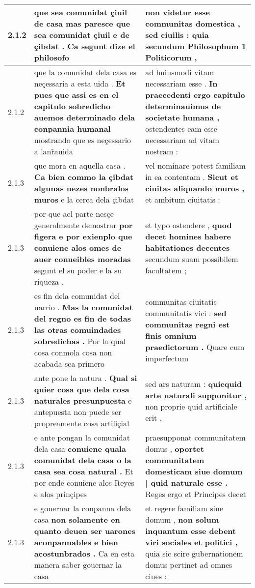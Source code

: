 \begin{tabular}{|p{1cm}|p{6.5cm}|p{6.5cm}|}
2.1.2 & que sea comunidat çiuil de casa mas paresce \textbf{ que sea comunidat çiuil e de çibdat . } Ca segunt dize el philosofo & non videtur esse communitas domestica , \textbf{ sed ciuilis : } quia secundum Philosophum 1 Politicorum , \\\hline
2.1.2 & que la comunidat dela casa es neçessaria a esta uida . \textbf{ Et pues que assi es en el capitulo sobredicho auemos determinado dela conpannia humanal } mostrando que es neçessario a lanr̃auida & ad huiusmodi vitam necessariam esse . \textbf{ In praecedenti ergo capitulo determinauimus de societate humana , } ostendentes eam esse necessariam ad vitam nostram : \\\hline
2.1.3 & que mora en aquella casa . \textbf{ Ca bien commo la çibdat algunas uezes nonbralos muros } e la cerca dela çibdat & vel nominare potest familiam in ea contentam . \textbf{ Sicut et ciuitas aliquando muros , } et ambitum ciuitatis : \\\hline
2.1.3 & por que ael parte nesçe generalmente demostrar \textbf{ por figera e por exienplo que conuiene alos omes de auer conueibles moradas } segunt el su poder e la su riqueza . & et typo ostendere , \textbf{ quod decet homines habere habitationes decentes } secundum suam possibilem facultatem ; \\\hline
2.1.3 & es fin dela comunidat del uarrio . \textbf{ Mas la comunidat del regno es fin de todas las otras comuindades sobredichas . } Por la qual cosa conmola cosa non acabada sea primero & communitas ciuitatis communitatis vici : \textbf{ sed communitas regni est finis omnium praedictorum . } Quare cum imperfectum \\\hline
2.1.3 & ante pone la natura . \textbf{ Qual si quier cosa que dela cosa naturales presunpuesta } e antepuesta non puede ser propreamente cosa artifiçial & sed ars naturam : \textbf{ quicquid arte naturali supponitur , } non proprie quid artificiale erit , \\\hline
2.1.3 & e ante pongan la comunidat dela casa \textbf{ conuiene quala comunidat dela casa o la casa sea cosa natural . } Et por ende conuiene alos Reyes e alos prinçipes & praesupponat communitatem domus , \textbf{ oportet communitatem domesticam siue domum | quid naturale esse . } Reges ergo et Principes decet \\\hline
2.1.3 & e gouernar la conpanna dela casa \textbf{ non solamente en quanto deuen ser uarones aconpannables e bien acostunbrados . } Ca en esta manera saber gouernar la casa & et regere familiam siue domum , \textbf{ non solum inquantum esse debent viri sociales et politici , } quia sic scire gubernationem domus pertinet ad omnes ciues : \\\hline

\end{tabular}

